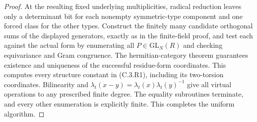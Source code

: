 \begin{proof}
At the resulting fixed underlying multiplicities, radical
reduction leaves only a determinant bit for each nonempty
symmetric-type component and one forced class for the other
types. Construct the finitely many candidate orthogonal sums
of the displayed generators, exactly as in the finite-field
proof, and test each against the actual form by enumerating
all $P\in\mathrm{GL}_N(R)$ and checking equivariance and Gram
congruence. The hermitian-category theorem guarantees existence
and uniqueness of the successful residue-form coordinates.
This computes every structure constant in (C.3.R1), including
its two-torsion coordinates. Bilinearity and
$\lambda_t(x-y)=\lambda_t(x)\lambda_t(y)^{-1}$ give all virtual
operations to any prescribed finite degree. The equality
subroutines terminate, and every other enumeration is explicitly
finite. This completes the uniform algorithm.
\end{proof}

